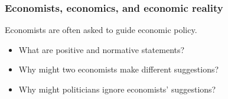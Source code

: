 \documentclass[aspectratio=169]{beamer}
\begin{document}
\begin{frame}
    \frametitle{Economists, economics, and economic reality}    
    Economists are often asked to guide economic policy.
    \begin{itemize}
        \item What are positive and normative statements?
        \item Why might two economists make different suggestions?
        \item Why might politicians ignore economists' suggestions?
    \end{itemize}
\end{frame}
\end{document}
